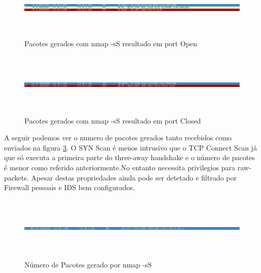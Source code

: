 \begin{figure}[h!]
	\centering
		
	\includegraphics[width=\textwidth,height=3cm,keepaspectratio]{images/nmapsSO.png}
		
	\caption{Pacotes gerados com nmap -sS resultado em port Open}
		
	\label{fig:nmapsSO}
\end{figure}

\begin{figure}[h!]
	\centering
		
	\includegraphics[width=\textwidth,height=3cm,keepaspectratio]{images/nmapsSC.png}
		
	\caption{Pacotes gerados com nmap -sS resultado em port Closed}
		
	\label{fig:nmapsSC}
\end{figure}

A seguir podemos ver o numero de pacotes gerados tanto recebidos como enviados na figura \ref{fig:nmapsSPacotes}.
O SYN Scan é menos intrusivo que o TCP Connect Scan já que só executa a primeira parte do three-away handshake e o número de pacotes é menor como referido anteriormente.No entanto necessita privilegios para raw-packets. Apesar destas propriedades ainda pode ser detetado e filtrado por Firewall pessoais e IDS bem configurados.

\begin{figure}[h!]
	\centering
		
	\includegraphics[width=\textwidth,height=3cm,keepaspectratio]{images/nmapsSPacotes.png}
		
	\caption{Número de Pacotes gerado por nmap -sS}
		
	\label{fig:nmapsSPacotes}
\end{figure}

